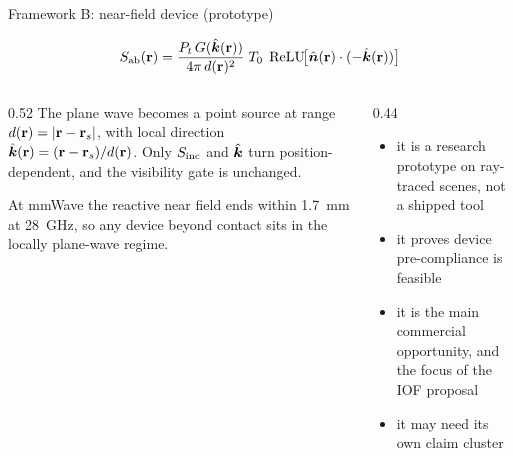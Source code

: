 \documentclass[aspectratio=169, 10pt]{beamer}
\begin{document}
\begin{frame}{Framework B: near-field device (prototype)}
  \begin{resultbox}
    \vspace{-6pt}
    \[
      S_{\mathrm{ab}}(\mathbf{r}) = \frac{P_t\,G(\hat{\bm{k}}(\mathbf{r}))}{4\pi\,d(\mathbf{r})^2}\; T_0\;
      \operatorname{ReLU}\!\bigl[\hat{\bm{n}}(\mathbf{r})\cdot(-\hat{\bm{k}}(\mathbf{r}))\bigr]
    \]
  \end{resultbox}
  \vspace{1pt}
  \begin{columns}[T]
    \begin{column}{0.52\textwidth}
      The plane wave becomes a point source at range $d(\mathbf{r})=|\mathbf{r}-\mathbf{r}_s|$, with local direction $\hat{\bm{k}}(\mathbf{r})=(\mathbf{r}-\mathbf{r}_s)/d(\mathbf{r})$. Only $S_{\mathrm{inc}}$ and $\hat{\bm{k}}$ turn position-dependent, and the visibility gate is unchanged.

      \vspace{4pt}
      {\footnotesize At mmWave the reactive near field ends within \SI{1.7}{\milli\metre} at \SI{28}{\giga\hertz}, so any device beyond contact sits in the locally plane-wave regime.}
    \end{column}
    \begin{column}{0.44\textwidth}
      \begin{itemize}
        \item it is a research prototype on ray-traced scenes, not a shipped tool
        \item it proves device pre-compliance is feasible
        \item it is the main commercial opportunity, and the focus of the IOF proposal
        \item it may need its own claim cluster
      \end{itemize}
    \end{column}
  \end{columns}
\end{frame}

\end{document}
